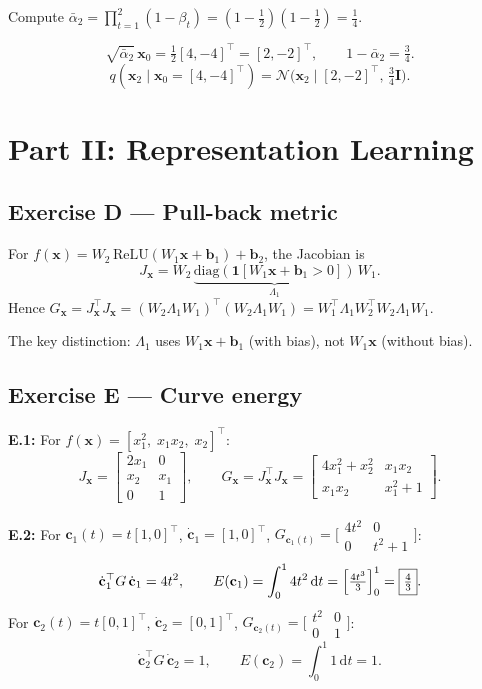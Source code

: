 \documentclass[12pt,a4paper]{article}
\newcommand{\N}{\mathcal{N}}
\newcommand{\ans}[1]{\tcbox[colback=yellow!20,colframe=orange!60,size=small]{\textbf{#1}}}
\begin{document}
Compute $\bar\alpha_2=\prod_{t=1}^{2}(1-\beta_t)=(1-\tfrac{1}{2})(1-\tfrac{1}{2})=\tfrac{1}{4}$.

\[
  \sqrt{\bar\alpha_2}\,\mathbf{x}_0=\tfrac{1}{2}[4,-4]^\top=[2,-2]^\top,
  \qquad
  1-\bar\alpha_2=\tfrac{3}{4}.
\]
\[
  \boxed{q(\mathbf{x}_2\mid\mathbf{x}_0=[4,-4]^\top)=\N\!\bigl(\mathbf{x}_2\mid[2,-2]^\top,\,\tfrac{3}{4}\mathbf{I}\bigr).}
\]

\newpage
\section*{Part II: Representation Learning}

\subsection*{Exercise D --- Pull-back metric \hfill \ans{Answer: A}}

For $f(\mathbf{x})=W_2\,\mathrm{ReLU}(W_1\mathbf{x}+\mathbf{b}_1)+\mathbf{b}_2$, the Jacobian is
\[
  J_\mathbf{x}=W_2\,\underbrace{\mathrm{diag}(\mathbf{1}[W_1\mathbf{x}+\mathbf{b}_1>0])}_{\Lambda_1}\,W_1.
\]
Hence $G_\mathbf{x}=J_\mathbf{x}^\top J_\mathbf{x}=(W_2\Lambda_1 W_1)^\top(W_2\Lambda_1 W_1)=W_1^\top\Lambda_1 W_2^\top W_2\Lambda_1 W_1$.

The key distinction: $\Lambda_1$ uses $W_1\mathbf{x}+\mathbf{b}_1$ (with bias), not $W_1\mathbf{x}$ (without bias).

\subsection*{Exercise E --- Curve energy}

\textbf{E.1:} For $f(\mathbf{x})=[x_1^2,\;x_1 x_2,\;x_2]^\top$:
\[
  J_\mathbf{x}=\begin{bmatrix}2x_1&0\\x_2&x_1\\0&1\end{bmatrix},
  \qquad
  G_\mathbf{x}=J_\mathbf{x}^\top J_\mathbf{x}
  =\begin{bmatrix}4x_1^2+x_2^2 & x_1 x_2\\x_1 x_2 & x_1^2+1\end{bmatrix}.
\]

\textbf{E.2:} For $\mathbf{c}_1(t)=t[1,0]^\top$, $\dot{\mathbf{c}}_1=[1,0]^\top$, $G_{\mathbf{c}_1(t)}=\bigl[\begin{smallmatrix}4t^2&0\\0&t^2+1\end{smallmatrix}\bigr]$:
\[
  \dot{\mathbf{c}}_1^\top G\,\dot{\mathbf{c}}_1=4t^2,\qquad
  E(\mathbf{c}_1)=\int_0^1 4t^2\,\mathrm{d}t=\Bigl[\tfrac{4t^3}{3}\Bigr]_0^1=\boxed{\tfrac{4}{3}}.
\]
For $\mathbf{c}_2(t)=t[0,1]^\top$, $\dot{\mathbf{c}}_2=[0,1]^\top$, $G_{\mathbf{c}_2(t)}=\bigl[\begin{smallmatrix}t^2&0\\0&1\end{smallmatrix}\bigr]$:
\[
  \dot{\mathbf{c}}_2^\top G\,\dot{\mathbf{c}}_2=1,\qquad
  E(\mathbf{c}_2)=\int_0^1 1\,\mathrm{d}t=\boxed{1}.
\]
\end{document}
